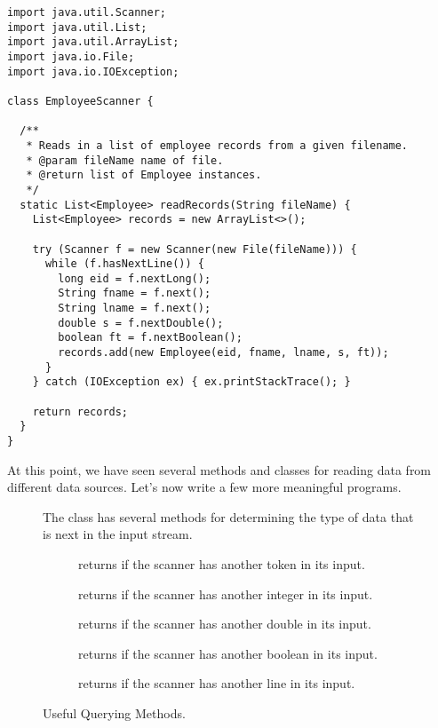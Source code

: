 \begin{lstlisting}[language=MyJava]
import java.util.Scanner;
import java.util.List;
import java.util.ArrayList;
import java.io.File;
import java.io.IOException;

class EmployeeScanner {

  /**
   * Reads in a list of employee records from a given filename.
   * @param fileName name of file.
   * @return list of Employee instances.
   */
  static List<Employee> readRecords(String fileName) {
    List<Employee> records = new ArrayList<>();

    try (Scanner f = new Scanner(new File(fileName))) {
      while (f.hasNextLine()) {
        long eid = f.nextLong();
        String fname = f.next();
        String lname = f.next();
        double s = f.nextDouble();
        boolean ft = f.nextBoolean();
        records.add(new Employee(eid, fname, lname, s, ft));
      }
    } catch (IOException ex) { ex.printStackTrace(); }

    return records;
  }
}
\end{lstlisting}

At this point, we have seen several methods and classes for reading data from different data sources. 
Let's now write a few more meaningful programs.

\begin{figure}[tp]
  \small
  \begin{tcolorbox}[title=Scanner Querying Methods]
    The  class has several methods for determining the type of data that is next in the input stream.
    \vspace{2ex}
  \begin{description}
    \item [] returns  if the scanner has another token in its input.
    \item [] returns  if the scanner has another integer in its input.
    \item [] returns  if the scanner has another double in its input.
    \item [] returns  if the scanner has another boolean in its input.
    \item [] returns  if the scanner has another line in its input.
  \end{description}
\end{tcolorbox}
\caption{Useful  Querying Methods.}
\label{fig:scq}
\end{figure}

